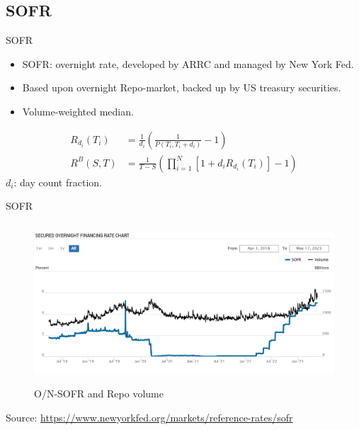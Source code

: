 \documentclass[UKenglish]{beamer}
\begin{document}
\subsection{SOFR}
\begin{frame}{SOFR}
\begin{itemize}
    \item SOFR: overnight rate, developed by ARRC and managed by New York Fed.
    \item Based upon overnight Repo-market, backed up by US treasury securities. 
    \item Volume-weighted median. 
\end{itemize} 

\begin{definition}
\begin{align*}
R_{d_{i}}(T_{i}) &= \frac{1}{d_{i}}\left(
\frac{1}{P(T_{i}, T_{i}+d_{i})} - 1
\right) \\ 
R^{B}(S,T) &= \frac{1}{T-S}\left(
\prod_{i=1}^{N}[1+d_{i}R_{d_{i}}(T_{i})] - 1
\right)
\end{align*}
$d_{i}$: day count fraction. 

\end{definition}

\end{frame}


\begin{frame}{SOFR}
\begin{figure}[htp]
    \centering
    \includegraphics[height = 6cm, width=12cm]{SOFR/SOFR_Repo.PNG}
    \caption{O/N-SOFR and Repo volume}
\end{figure}
Source: \url{https://www.newyorkfed.org/markets/reference-rates/sofr}
\end{frame}
\end{document}
